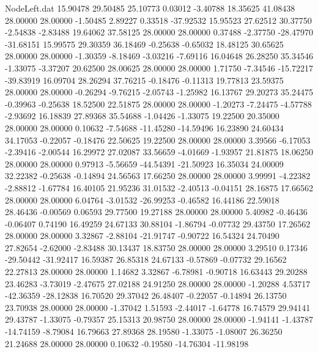 \begin{filecontents}{NodeLeft.dat}
  15.90478   29.50485   25.10773     0.03012   -3.40788   18.35625   41.08438   28.00000   28.00000   -1.50485    2.89227    0.33518  -37.92532
  15.95523   27.62512   30.37750    -2.54838   -2.83488   19.64062   37.58125   28.00000   28.00000    0.37488   -2.37750  -28.47970  -31.68151
  15.99575   29.30359   36.18469    -0.25638   -0.65032   18.48125   30.65625   28.00000   28.00000   -1.30359   -8.18469   -3.03216   -7.69116
  16.04648   26.28250   35.34546    -1.33075   -3.37207   20.62500   28.00625   28.00000   28.00000    1.71750   -7.34546  -15.72217  -39.83919
  16.09704   28.26294   37.76215    -0.18476   -0.11313   19.77813   23.59375   28.00000   28.00000   -0.26294   -9.76215   -2.05743   -1.25982
  16.13767   29.20273   35.24475    -0.39963   -0.25638   18.52500   22.51875   28.00000   28.00000   -1.20273   -7.24475   -4.57788   -2.93692
  16.18839   27.89368   35.54688    -1.04426   -1.33075   19.22500   20.35000   28.00000   28.00000    0.10632   -7.54688  -11.45280  -14.59496
  16.23890   24.60434   34.17053    -0.22057   -0.18476   22.50625   19.22500   28.00000   28.00000    3.39566   -6.17053   -2.39416   -2.00544
  16.29972   27.02087   33.56659    -4.01669   -1.93957   21.81875   18.06250   28.00000   28.00000    0.97913   -5.56659  -44.54391  -21.50923
  16.35034   24.00009   32.22382    -0.25638   -0.14894   24.56563   17.66250   28.00000   28.00000    3.99991   -4.22382   -2.88812   -1.67784
  16.40105   21.95236   31.01532    -2.40513   -0.04151   28.16875   17.66562   28.00000   28.00000    6.04764   -3.01532  -26.99253   -0.46582
  16.44186   22.59018   28.46436    -0.00569    0.06593   29.77500   19.27188   28.00000   28.00000    5.40982   -0.46436   -0.06407    0.74190
  16.49259   24.67133   30.88104    -1.86794   -0.07732   29.43750   17.26562   28.00000   28.00000    3.32867   -2.88104  -21.91747   -0.90722
  16.54324   24.70490   27.82654    -2.62000   -2.83488   30.13437   18.83750   28.00000   28.00000    3.29510    0.17346  -29.50442  -31.92417
  16.59387   26.85318   24.67133    -0.57869   -0.07732   29.16562   22.27813   28.00000   28.00000    1.14682    3.32867   -6.78981   -0.90718
  16.63443   29.20288   23.46283    -3.73019   -2.47675   27.02188   24.91250   28.00000   28.00000   -1.20288    4.53717  -42.36359  -28.12838
  16.70520   29.37042   26.48407    -0.22057   -0.14894   26.13750   23.70938   28.00000   28.00000   -1.37042    1.51593   -2.44017   -1.64778
  16.74579   29.94141   29.43787    -1.33075   -0.79357   25.15313   20.98750   28.00000   28.00000   -1.94141   -1.43787  -14.74159   -8.79084
  16.79663   27.89368   28.19580    -1.33075   -1.08007   26.36250   21.24688   28.00000   28.00000    0.10632   -0.19580  -14.76304  -11.98198

\end{filecontents}
